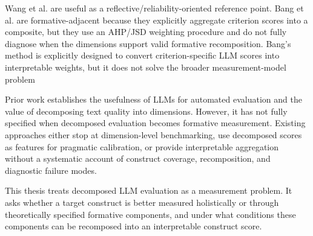 Wang et al. are useful as a reflective/reliability-oriented reference point. Bang et al. are formative-adjacent because they explicitly aggregate criterion scores into a composite, but they use an AHP/JSD weighting procedure and do not fully diagnose when the dimensions support valid formative recomposition. Bang’s method is explicitly designed to convert criterion-specific LLM scores into interpretable weights, but it does not solve the broader measurement-model problem


Prior work establishes the usefulness of LLMs for automated evaluation and the value of decomposing text quality into dimensions. However, it has not fully specified when decomposed evaluation becomes formative measurement. Existing approaches either stop at dimension-level benchmarking, use decomposed scores as features for pragmatic calibration, or provide interpretable aggregation without a systematic account of construct coverage, recomposition, and diagnostic failure modes.

This thesis treats decomposed LLM evaluation as a measurement problem. It asks whether a target construct is better measured holistically or through theoretically specified formative components, and under what conditions these components can be recomposed into an interpretable construct score.


\citet{hashemi_llm-rubric_2024} 
















